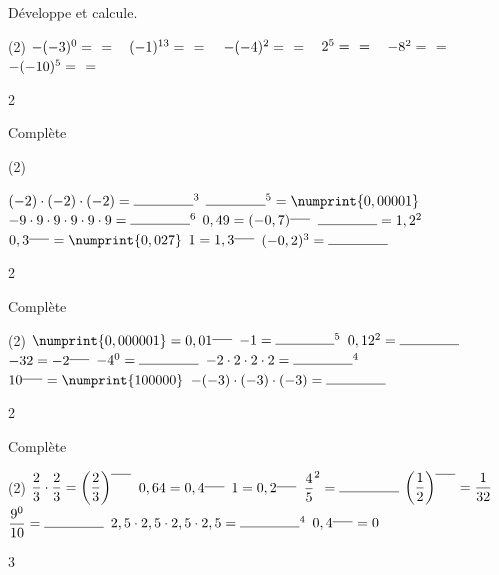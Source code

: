 \documentclass[a4paper,11pt]{report}
\begin{document}
\begin{exop}{
Développe et calcule.
\begin{tasks}(2)
    \task $-(-3)^0=~\hrulefill~=$ ~
    \task $(-1)^{13}=~\hrulefill~=$ ~
    \task $-(-4)^2=~\hrulefill~=$ ~
    \task $2^5=~\hrulefill~=$ ~
    \task $-8^2=~\hrulefill~=$ ~
    \task $-(-10)^5=~\hrulefill~=$ ~
\end{tasks}
}{2}
\end{exop}










\begin{exop}{
Complète
\begin{tasks}(2)
    
    \task $(-2)\cdot(-2)\cdot(-2)=\ligne{1.5}^3$
    \task $\ligne{1.5}^5=\numprint{0,00001}$
    \task $-9\cdot9\cdot9\cdot9\cdot9\cdot9=\ligne{1.5}^6$
    \task $0,49=(-0,7)^{\ligne{0.5}}$
    \task $\ligne{1.5}=1,2^2$
    \task $0,3^{\ligne{0.5}}=\numprint{0,027}$
    \task $1=1,3^{\ligne{0.5}}$
    \task $(-0,2)^3=\ligne{1.5}$    
\end{tasks}
}{2}
\end{exop}


\begin{exop}{
Complète
\begin{tasks}(2)
    \task $\numprint{0,000001}=0,01^{\ligne{0.5}}$
    \task $-1=\ligne{1.5}^5$
    \task $0,12^2=\ligne{1.5}$
    \task $-32=-2^{\ligne{0.5}}$
    \task $-4^0=\ligne{1.5}$
    \task $-2\cdot2\cdot2\cdot2=\ligne{1.5}^4$
    \task $10^{\ligne{0.5}}=\numprint{100000}$
    \task $-(-3)\cdot(-3)\cdot(-3)=\ligne{1.5}$
\end{tasks}
}{2}
\end{exop}

\begin{exop}{
Complète %
\begin{tasks}(2)
    \task $\dfrac{2}{3}\cdot\dfrac{2}{3}={\left(\dfrac{2}{3}\right)}^{\ligne{0.5}}$
    \task $0,64=0,4^{\ligne{0.5}}$
    \task $1=0,2^{\ligne{0.5}}$
    \task $\dfrac{4}{5}^2=\ligne{1.5}$
    \task ${\left(\dfrac{1}{2}\right)}^{\ligne{0.5}}=\dfrac{1}{32}$
    \task $\dfrac{9^0}{10}=\ligne{1.5}$
    \task $2,5\cdot2,5\cdot2,5\cdot2,5=\ligne{1.5}^4$
    \task $0,4^{\ligne{0.5}}=0$
\end{tasks}
}{3}
\end{exop}
\end{document}
